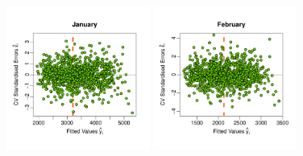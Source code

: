 \documentclass[a4paper, 12pt]{article}
\begin{document}
\renewcommand{\scale}{12.7em}
\begin{figure}
\centering
 \includegraphics[width=\scale]{Emulator_CV/ScatterPlots/January_CV_Scatter}\hspace{-1ex}
 \includegraphics[width=\scale]{Emulator_CV/ScatterPlots/February_CV_Scatter}\hspace{-1ex}

\end{figure}
\end{document}
